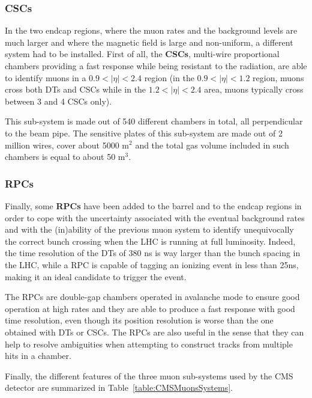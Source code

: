 \documentclass[a4paper, 10pt, openright]{report}
\begin{document}
\subsubsection*{\acfp{CSC}}

In the two endcap regions, where the muon rates and the background levels are much larger and where the magnetic field is large and non-uniform, a different system had to be installed. First of all, the \textbf{\acp{CSC}}, multi-wire proportional chambers providing a fast response while being resistant to the radiation, are able to identify muons in a $0.9 < |\eta| < 2.4$ region (in the $0.9 < |\eta| < 1.2$ region, muons cross both \acp{DT} and \acp{CSC} while in the $1.2 < |\eta| < 2.4$ area, muons typically cross between 3 and 4 \acp{CSC} only). 

This sub-system is made out of 540 different chambers in total, all perpendicular to the beam pipe. The sensitive plates of this sub-system are made out of 2 million wires, cover about 5000 m$^2$ and the total gas volume included in such chambers is equal to about 50 m$^3$.

\subsubsection*{\acfp{RPC}}

Finally, some \textbf{\acp{RPC}} have been added to the barrel and to the endcap regions in order to cope with the uncertainty associated with the eventual background rates and with the (in)ability of the previous muon
system to identify unequivocally the correct bunch crossing when the \ac{LHC} is running at full luminosity. Indeed, the time resolution of the \acp{DT} of 380 ns is way larger than the bunch spacing in the \ac{LHC}, while a \ac{RPC} is capable
of tagging an ionizing event in less than 25ns, making it an ideal candidate to trigger the event.

The \acp{RPC} are double-gap chambers operated in avalanche mode to ensure good operation at high rates and they are able to produce a fast response with good time resolution, even though its position resolution is worse than the one obtained with \acp{DT} or \acp{CSC}. The \acp{RPC} are also useful in the sense that they can help to resolve ambiguities when attempting to construct tracks from multiple hits in a chamber. 

Finally, the different features of the three muon sub-systems used by the \ac{CMS} detector are summarized in Table~\ref{table:CMSMuonsSystems}.
\end{document}
